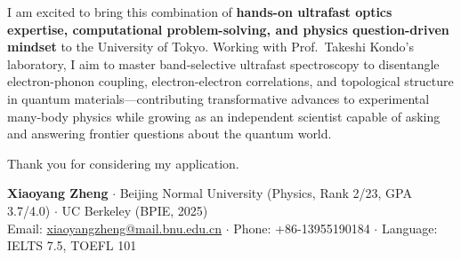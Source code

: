 \documentclass[11pt,a4paper]{article}
\begin{document}
I am excited to bring this combination of \textbf{hands-on ultrafast optics expertise, computational problem-solving, and physics question-driven mindset} to the University of Tokyo. Working with Prof.~Takeshi Kondo's laboratory, I aim to master band-selective ultrafast spectroscopy to disentangle electron-phonon coupling, electron-electron correlations, and topological structure in quantum materials—contributing transformative advances to experimental many-body physics while growing as an independent scientist capable of asking and answering frontier questions about the quantum world.

Thank you for considering my application.

\vspace{0.3em}

\noindent
\textbf{Xiaoyang Zheng} $\cdot$ Beijing Normal University (Physics, Rank 2/23, GPA 3.7/4.0) $\cdot$ UC Berkeley (BPIE, 2025)\\
Email: \href{mailto:xiaoyangzheng@mail.bnu.edu.cn}{xiaoyangzheng@mail.bnu.edu.cn} $\cdot$ Phone: +86-13955190184 $\cdot$ Language: IELTS 7.5, TOEFL 101
\end{document}
